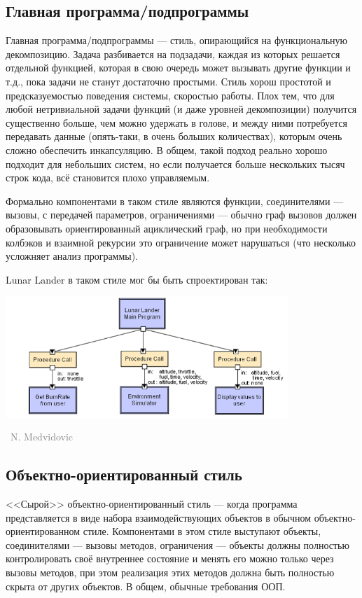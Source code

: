 \documentclass[a5paper]{article}
\newcommand{\attribution}[1] {
    \vspace{-4mm}\begin{flushright}\begin{scriptsize}\textcolor{gray}
    {\textcopyright\, #1}\end{scriptsize}\end{flushright}
}
\begin{document}
\subsection{Главная программа/подпрограммы}

Главная программа/подпрограммы --- стиль, опирающийся на функциональную декомпозицию. Задача разбивается на подзадачи, каждая из которых решается отдельной функцией, которая в свою очередь может вызывать другие функции и т.д., пока задачи не станут достаточно простыми. Стиль хорош простотой и предсказуемостью поведения системы, скоростью работы. Плох тем, что для любой нетривиальной задачи функций (и даже уровней декомпозиции) получится существенно больше, чем можно удержать в голове, и между ними потребуется передавать данные (опять-таки, в очень больших количествах), которым очень сложно обеспечить инкапсуляцию. В общем, такой подход реально хорошо подходит для небольших систем, но если получается больше нескольких тысяч строк кода, всё становится плохо управляемым.

Формально компонентами в таком стиле являются функции, соединителями --- вызовы, с передачей параметров, ограничениями --- обычно граф вызовов должен образовывать ориентированный ациклический граф, но при необходимости колбэков и взаимной рекурсии это ограничение может нарушаться (что несколько усложняет анализ программы).

Lunar Lander в таком стиле мог бы быть спроектирован так:

\begin{center}
    \includegraphics[width=0.8\textwidth]{mainProgramAndSubroutinesLL.png}
    \attribution{N. Medvidovic}
\end{center}

\subsection{Объектно-ориентированный стиль}

<<Сырой>> объектно-ориентированный стиль --- когда программа представляется в виде набора взаимодействующих объектов в обычном объектно-ориентированном стиле. Компонентами в этом стиле выступают объекты, соединителями --- вызовы методов, ограничения --- объекты должны полностью контролировать своё внутреннее состояние и менять его можно только через вызовы методов, при этом реализация этих методов должна быть полностью скрыта от других объектов. В общем, обычные требования ООП.
\end{document}
